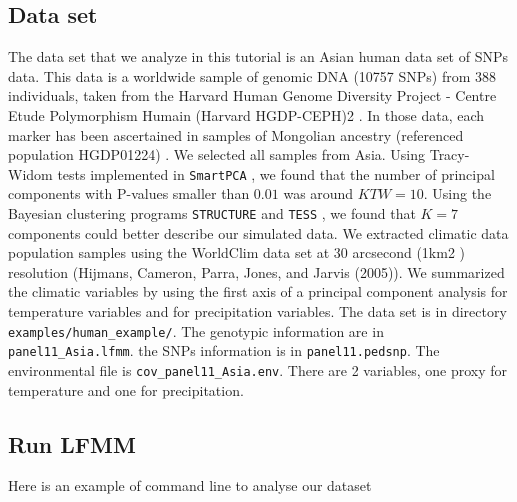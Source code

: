 \documentclass[10pt,a4paper]{article}
\begin{document}
\subsection{Data set}
The data set that we analyze in this tutorial is an Asian human data set of SNPs data.
This data is a worldwide sample of genomic DNA (10757 SNPs) from 388 individuals,
taken from the Harvard Human Genome Diversity Project - Centre
Etude Polymorphism Humain (Harvard HGDP-CEPH)2 . In those
data, each marker has been ascertained in samples of Mongolian
ancestry (referenced population HGDP01224) \cite{Patterson_2012}. We selected all
samples from Asia.
Using Tracy-Widom tests implemented in {\tt SmartPCA} \cite{Patterson_2006}, we found that the number of
principal components with P-values smaller than $0.01$ was around $KTW = 10$. Using
the Bayesian clustering programs {\tt STRUCTURE} \cite{Pritchard_2000} and 
{\tt TESS} \cite{Chen_2007, Durand_2009}, we found that $K = 7$
components could better describe our simulated data.
We extracted climatic data population samples using the WorldClim
data set at 30 arcsecond (1km2 ) resolution
(Hijmans, Cameron, Parra, Jones, and Jarvis (2005)).
We summarized the climatic variables by using the first axis of a
principal component analysis for temperature variables and for
precipitation variables.
The data set is in directory \verb|examples/human_example/|. The genotypic information
are in \verb|panel11_Asia.lfmm|. the SNPs information is in \verb|panel11.pedsnp|.
The environmental file is \verb|cov_panel11_Asia.env|. There are 2 variables, one proxy
for temperature and one for precipitation.

\subsection{Run LFMM}
Here is an example of command line to analyse our dataset
\end{document}
